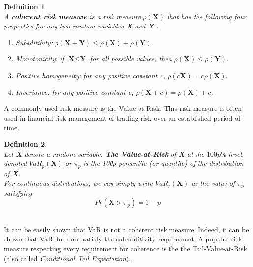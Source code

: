 \documentclass[12pt,travaildirige,nobabel, twoside]{dms}
\numberwithin{equation}{section}
\numberwithin{table}{chapter}
\numberwithin{figure}{chapter}
\newtheorem{mydef}{Definition}[section]
\begin{document}
\begin{mydef}\leavevmode \\
A \textbf{coherent risk measure} is a risk measure $\rho(\textbf{X})$ that has the following four properties for any two random variables \textbf{X} and \textbf{Y} \nocite{lossmodel}.\\ 

\begin{enumerate} 
\item Subaditibity: $ \rho(\textbf{X}+\textbf{Y})\leq \rho(\textbf{X})+\rho(\textbf{Y})$.
 \item Monotonicity: if $\textbf{X} \leq \textbf{Y}$ for all possible values, then $\rho(\textbf{X}) \leq \rho(\textbf{Y})$.
 \item Positive homogeneity: for any positive constant c, $\rho(c\textbf{X})=c\rho(\textbf{X})$.
 \item Invariance: for any positive constant c, $\rho(\textbf{X}+c)=\rho(\textbf{X})+c$.\\
  \end{enumerate}
\end{mydef}

A commonly used risk measure is the Value-at-Risk. This risk measure is often used in financial risk management of trading risk over an established period of time. \\

\begin{mydef}\leavevmode \\
Let \textbf{X} denote a random variable. \textbf{The Value-at-Risk} of \textbf{X} at the $100p\%$ level, denoted $VaR_p(\textbf{X})$ or $\pi_p$ is the 100p percentile (or quantile) of the distribution of \textbf{X}\nocite{lossmodel}.\\ 

For continuous distributions, we can simply write $VaR_p(\textbf{X})$ as the value of $\pi_p$ satisfying \begin{equation}
Pr(\textbf{X}>\pi_p)=1-p
\end{equation}\\

\end{mydef}

It can be easily shown that VaR is not a coherent risk measure.  Indeed, it can be shown that VaR does not satisfy the subadditivity requirement. A popular risk measure respecting every requirement for  coherence is the the Tail-Value-at-Risk (also called \textit{Conditional Tail Expectation}).\\
\end{document}

